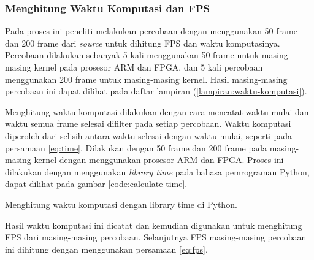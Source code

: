 \subsubsection{Menghitung Waktu Komputasi dan FPS}
Pada proses ini peneliti melakukan percobaan dengan menggunakan 50 frame dan 200 frame dari \textit{source} untuk dihitung FPS dan waktu komputasinya. Percobaan dilakukan sebanyak 5 kali menggunakan 50 frame untuk masing-masing kernel pada prosesor ARM dan FPGA, dan 5 kali percobaan menggunakan 200 frame untuk masing-masing kernel. Hasil masing-masing percobaan ini dapat dilihat pada daftar lampiran (\ref{lampiran:waktu-komputasi}).

Menghitung waktu komputasi dilakukan dengan cara mencatat waktu mulai dan waktu semua frame selesai difilter pada setiap percobaan. Waktu komputasi diperoleh dari selisih antara waktu selesai dengan waktu mulai, seperti pada persamaan \ref{eq:time}. Dilakukan dengan 50 frame dan 200 frame pada masing-masing kernel dengan menggunakan prosesor ARM dan FPGA. Proses ini dilakukan dengan menggunakan \textit{library time} pada bahasa pemrograman Python, dapat dilihat pada gambar \ref{code:calculate-time}.
\begin{afigure}
    
    \caption{Menghitung waktu komputasi dengan library time di Python.}
    \label{code:calculate-time}
\end{afigure}

Hasil waktu komputasi ini dicatat dan kemudian digunakan untuk menghitung FPS dari masing-masing percobaan. Selanjutnya FPS masing-masing percobaan ini dihitung dengan menggunakan persamaan \ref{eq:fps}.

